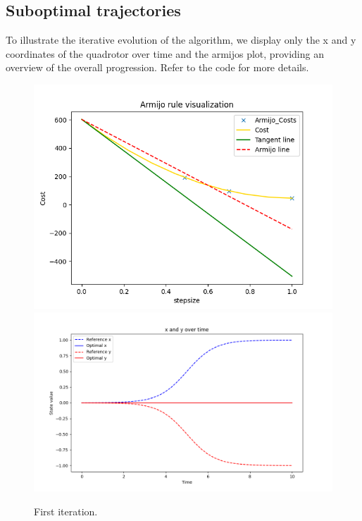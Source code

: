 \subsection{Suboptimal trajectories}
To illustrate the iterative evolution of the algorithm, we display only the x and y coordinates of the quadrotor over time and the armijos plot, providing an overview of the overall progression. Refer to the code for more details.
\begin{figure}[H]
  \centering
  \includegraphics[width=1\textwidth]{pictures/Figure_1_1.png}\hfill \\
  \includegraphics[width=1\textwidth]{pictures/Figure_1_2.png}\hfill
  \caption{First iteration.}
  \label{fig:Reference trajectory}
\end{figure}

